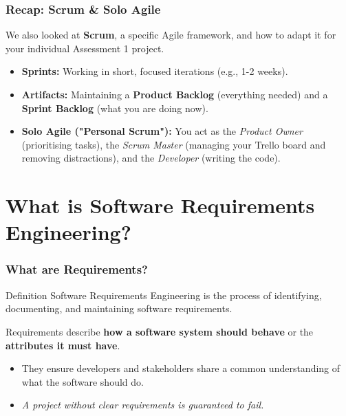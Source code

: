 \documentclass[xcolor=table]{beamer}
\begin{document}
\begin{frame}
    \frametitle{Recap: Scrum \& Solo Agile}
    We also looked at \textbf{Scrum}, a specific Agile framework, and how to adapt it for your individual Assessment 1 project.
    
    


    
    \begin{itemize}
        \item \textbf{Sprints:} Working in short, focused iterations (e.g., 1-2 weeks).
        \item \textbf{Artifacts:} Maintaining a \textbf{Product Backlog} (everything needed) and a \textbf{Sprint Backlog} (what you are doing now).
        \item \textbf{Solo Agile ("Personal Scrum"):} You act as the \textit{Product Owner} (prioritising tasks), the \textit{Scrum Master} (managing your Trello board and removing distractions), and the \textit{Developer} (writing the code).
    \end{itemize}
\end{frame}
\section{What is Software Requirements Engineering?}


\begin{frame}
    \frametitle{What are Requirements?}
    \begin{block}{Definition}
        Software Requirements Engineering is the process of identifying, documenting, and maintaining software requirements.
    \end{block}
    \vspace{0.3cm}
    Requirements describe \textbf{how a software system should behave} or the \textbf{attributes it must have}.
    \begin{itemize}
        \item They ensure developers and stakeholders share a common understanding of what the software should do.
        \item \textit{A project without clear requirements is guaranteed to fail.}
    \end{itemize}
    \vspace{0.3cm}
    
    \begin{center}
        
    \end{center}
\end{frame}
\end{document}
